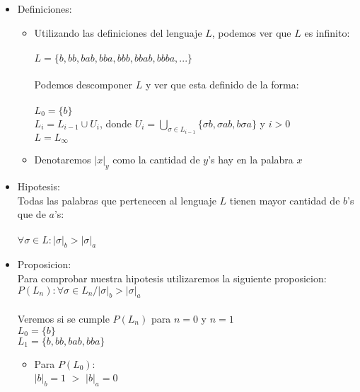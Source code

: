 \documentclass[spanish, draft]{article}
\begin{document}
\begin{itemize}
    \item Definiciones:
            \begin{itemize}
                \item Utilizando las definiciones del lenguaje $L$, podemos ver que $L$ es infinito:\\
                        \\
                        $L = \{b, bb, bab, bba, bbb, bbab, bbba, ...\}$ \\
                        \\
                        Podemos descomponer $L$ y ver que esta definido de la forma: \\
                        \\
                        $L_0 = \{b\}$ \\
                        $L_i = L_{i-1} \cup U_i$, donde $U_i = \bigcup\limits_{\sigma \in L_{i-1}} \{\sigma b, \sigma ab, b\sigma a\}$ y $i > 0$\\
                        $L = L_\infty$ \\
                \item Denotaremos $|x|_y$ como la cantidad de $y$'s hay en la palabra $x$
            \end{itemize}
    \item Hipotesis:\\
            Todas las palabras que pertenecen al lenguaje $L$ tienen mayor cantidad de $b$'s que de $a$'s:\\ \\
            $\forall \sigma \in L : |\sigma|_b > |\sigma|_a$\\
    \item Proposicion:\\
            Para comprobar nuestra hipotesis utilizaremos la siguiente proposicion:\\
            $P(L_n): \forall \sigma \in L_n / |\sigma|_b > |\sigma|_a$\\
            \\
            Veremos si se cumple $P(L_n)$ para $n = 0$ y $n = 1$\\
            $L_0 = \{b\}$ \\
            $L_1 = \{b, bb, bab, bba\}$
            \begin{itemize}
                \item Para $P(L_0):$\\
                        $|b|_b = 1$ $>$ $|b|_a = 0$

\end{itemize}
\end{itemize}
\end{document}
